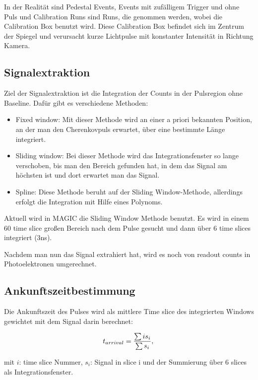 In der Realität sind Pedestal Events, Events mit zufälligem Trigger und ohne Puls und Calibration Runs sind Runs, die genommen werden, wobei die Calibration Box benutzt wird.
Diese Calibration Box befindet sich im Zentrum der Spiegel und verursacht kurze Lichtpulse mit konstanter Intensität in Richtung Kamera.


\subsection{Signalextraktion}
Ziel der Signalextraktion ist die Integration der Counts in der Pulsregion ohne Baseline.
Dafür gibt es verschiedene Methoden:
\begin{itemize}
 \item Fixed window: Mit dieser Methode wird an einer a priori bekannten Position, an der man den Cherenkovpuls erwartet, über eine bestimmte Länge integriert.
 \item Sliding window: Bei dieser Methode wird das Integrationsfenster so lange verschoben, bis man den Bereich gefunden hat, in dem das Signal am höchsten ist und dort erwartet man das Signal.
 \item Spline: Diese Methode beruht auf der Sliding Window-Methode, allerdings erfolgt die Integration mit Hilfe eines Polynoms.
\end{itemize}

Aktuell wird in MAGIC die Sliding Window Methode benutzt. Es wird in einem 60 time slice großen Bereich nach dem Pulse gesucht und dann über 6 time slices integriert (3ns).

Nachdem man nun das Signal extrahiert hat, wird es noch von readout counts in Photoelektronen umgerechnet.

\subsection{Ankunftszeitbestimmung}
Die Ankunftszeit des Pulses wird als mittlere Time slice des integrierten Windows gewichtet mit dem Signal darin berechnet:

\begin{equation}
 t_{arrival}=\frac{\sum i s_i}{\sum s_i},\\
\end{equation}
\begin{center}
\tiny{mit $i$: time slice Nummer, $s_i$: Signal in slice i und der Summierung über 6 slices als Integrationsfenster.}
\end{center}


